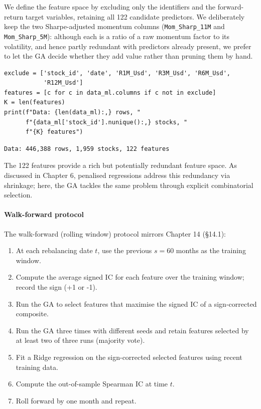 We define the feature space by excluding only the identifiers and the forward-return target variables, retaining all 122 candidate predictors. We deliberately keep the two Sharpe-adjusted momentum columns (\texttt{Mom\_Sharp\_11M} and \texttt{Mom\_Sharp\_5M}): although each is a ratio of a raw momentum factor to its volatility, and hence partly redundant with predictors already present, we prefer to let the GA decide whether they add value rather than pruning them by hand.

\begin{verbatim}
exclude = ['stock_id', 'date', 'R1M_Usd', 'R3M_Usd', 'R6M_Usd',
           'R12M_Usd']
features = [c for c in data_ml.columns if c not in exclude]
K = len(features)
print(f"Data: {len(data_ml):,} rows, "
      f"{data_ml['stock_id'].nunique():,} stocks, "
      f"{K} features")
\end{verbatim}

\begin{verbatim}
Data: 446,388 rows, 1,959 stocks, 122 features
\end{verbatim}

The 122 features provide a rich but potentially redundant feature space. As discussed in Chapter 6, penalised regressions address this redundancy via shrinkage; here, the GA tackles the same problem through explicit combinatorial selection.

\paragraph{Walk-forward protocol}

The walk-forward (rolling window) protocol mirrors Chapter 14 (§14.1):

\begin{enumerate}
\item At each rebalancing date $t$, use the previous $s = 60$ months as the training window.
\item Compute the average signed IC for each feature over the training window; record the sign (+1 or -1).
\item Run the GA to select features that maximise the signed IC of a sign-corrected composite.
\item Run the GA three times with different seeds and retain features selected by at least two of three runs (majority vote).
\item Fit a Ridge regression on the sign-corrected selected features using recent training data.
\item Compute the out-of-sample Spearman IC at time $t$.
\item Roll forward by one month and repeat.
\end{enumerate}


